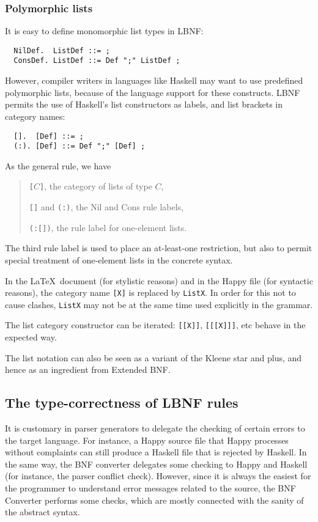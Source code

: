 \documentclass[10pt]{article}
\newcommand{\bequ}{\begin{quote}}
\newcommand{\enqu}{\end{quote}}
\begin{document}
\subsubsection{Polymorphic lists}

It is easy to define monomorphic list types in LBNF:
\begin{verbatim}
  NilDef.  ListDef ::= ;
  ConsDef. ListDef ::= Def ";" ListDef ;
\end{verbatim}
However, compiler writers in languages like
Haskell may want to use predefined
polymorphic lists, because of the language support for these constructs.
LBNF permits the use of Haskell's list constructors
as labels, and list brackets in category names:
\begin{verbatim}
  [].  [Def] ::= ;
  (:). [Def] ::= Def ";" [Def] ;
\end{verbatim}
As the general rule, we have
\bequ
{\tt[}$C${\tt ]}, the category of lists of type $C$,

{\tt []} and {\tt (:)}, the Nil and Cons rule labels,

{\tt (:[])}, the rule label for one-element lists.
\enqu
The third rule label is used to place an at-least-one restriction,
but also to permit special treatment of one-element lists
in the concrete syntax.

In the \LaTeX\ document (for stylistic reasons) and in the Happy file (for
syntactic reasons), the category name {\tt [X]} is replaced by {\tt ListX}.
In order for this not to cause clashes, {\tt ListX}
may not be at the same time used explicitly in the grammar.

The list category constructor can be iterated: {\tt [[X]]}, {\tt [[[X]]]}, etc
behave in the expected way.

The list notation can also be seen as a variant of the Kleene star and plus, and
hence as an ingredient from Extended BNF.




\subsection{The type-correctness of LBNF rules}

\label{typecheck}

It is customary in parser generators to delegate the checking of certain
errors to the target language. For instance, a Happy source file that
Happy processes without complaints can still produce a Haskell file
that is rejected by Haskell. In the same way, the BNF converter
delegates some checking to Happy and Haskell (for instance,
the parser conflict check). However, since it is always
the easiest for the programmer to understand error messages
related to the source, the BNF Converter performs some checks,
which are mostly connected with the sanity of the abstract syntax.
\end{document}
